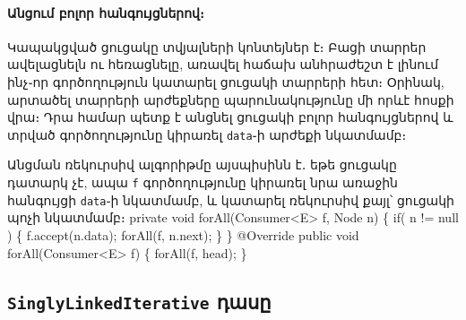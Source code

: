 %
%
\paragraph{Անցում բոլոր հանգույցներով։}
Կապակցված ցուցակը տվյալների կոնտեյներ է։ Բացի տարրեր 
ավելացնելն ու հեռացնելը, առավել հաճախ անհրաժեշտ է լինում 
ինչ֊որ գործողություն կատարել ցուցակի տարրերի հետ։ Օրինակ, 
արտածել տարրերի արժեքները պարունակությունը մի որևէ հոսքի
վրա։ Դրա համար պետք է անցնել ցուցակի բոլոր հանգույցներով
և տրված գործողությունը կիրառել \texttt{data}֊ի արժեքի
նկատմամբ։

Անցման ռեկուրսիվ ալգորիթմը այսպիսինն է․ եթե ցուցակը դատարկ 
չէ, ապա \texttt{f} գործողությունը կիրառել նրա առաջին հանգույցի 
\texttt{data}֊ի նկատմամբ, և կատարել ռեկուրսիվ քայլ՝ ցուցակի
պոչի նկատմամբ։
\nwenddocs{}\endmoddef{}
private void forAll(Consumer<E> f, Node n)
\{
  if( n != null ) \{
    f.accept(n.data);
    forAll(f, n.next);
  \}
\}
@Override
public void forAll(Consumer<E> f)
\{
  forAll(f, head);
\}
\nwendcode{}\nwdocspar


%
%
%
\subsection{\texttt{SinglyLinkedIterative} դասը}

